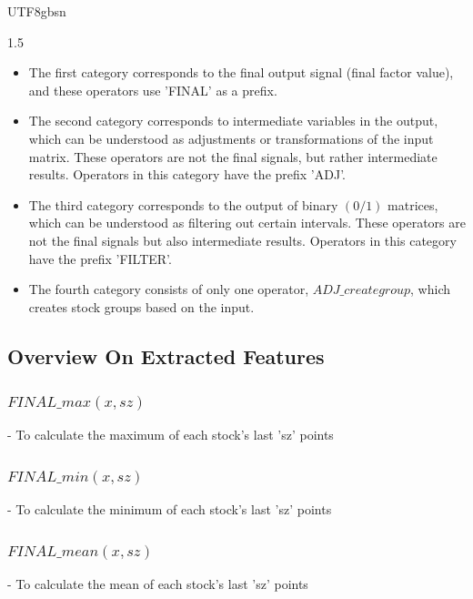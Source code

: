 \documentclass{article}
\begin{document}
\begin{CJK}{UTF8}{gbsn}
\begin{spacing}{1.5}
\begin{itemize}
\item[*] The first category corresponds to the final output signal (final factor value), and these operators use 'FINAL' as a prefix.
\item[*] The second category corresponds to intermediate variables in the output, which can be understood as adjustments or transformations of the input matrix. These operators are not the final signals, but rather intermediate results. Operators in this category have the prefix 'ADJ'.
\item[*] The third category corresponds to the output of binary $(0/1)$ matrices, which can be understood as filtering out certain intervals. These operators are not the final signals but also intermediate results. Operators in this category have the prefix 'FILTER'.
\item[*] The fourth category consists of only one operator, $ADJ\_creategroup$, which creates stock groups based on the input.
\end{itemize}


\subsection{Overview On Extracted Features}
\subsubsection{$FINAL\_max(x, sz)$}
   - To calculate the maximum of each stock's last 'sz' points
\subsubsection{$FINAL\_min(x, sz)$}                   
   - To calculate the minimum of each stock's last 'sz' points
\subsubsection{$FINAL\_mean(x, sz)$}                  
   - To calculate the mean of each stock's last 'sz' points

\end{spacing}
\end{CJK}
\end{document}
